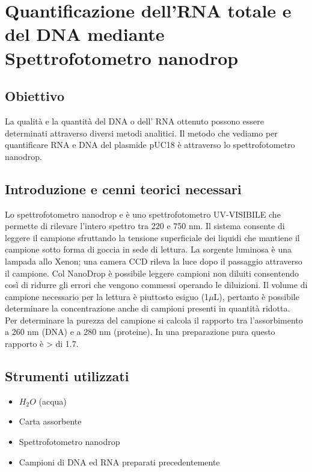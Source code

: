 \documentclass{extarticle}
\begin{document}
\newpage
\section{Quantificazione dell'RNA totale e del DNA mediante Spettrofotometro nanodrop}
\subsection*{Obiettivo} La qualità e la quantità del DNA o dell' RNA ottenuto possono essere determinati attraverso diversi metodi analitici. Il metodo che vediamo per quantificare RNA e DNA del plasmide pUC18 è attraverso lo spettrofotometro nanodrop.
\subsection*{Introduzione e cenni teorici necessari} Lo spettrofotometro nanodrop e è uno spettrofotometro UV-VISIBILE che permette di rilevare l'intero spettro tra 220 e 750 nm. Il sistema consente di leggere il campione sfruttando la tensione superficiale dei liquidi che mantiene il
campione sotto forma di goccia in sede di lettura. La sorgente luminosa è una lampada allo Xenon; una camera CCD rileva la luce dopo il passaggio attraverso il
campione. Col NanoDrop è possibile leggere campioni non diluiti consentendo così di ridurre gli errori che vengono commessi operando le diluizioni.
Il volume di campione necessario per la lettura è piuttosto esiguo (1$\mu$L), pertanto è possibile determinare la concentrazione anche di campioni presenti in quantità ridotta.\\
Per determinare la purezza del campione si calcola il rapporto tra l'assorbimento a 260 nm (DNA) e a 280 nm (proteine). In una preparazione pura questo rapporto è > di 1.7.
\subsection*{Strumenti utilizzati}
\begin{itemize}
    \item $H_{2}O$ (acqua)
    \item Carta assorbente
    \item Spettrofotometro nanodrop
    \item Campioni di DNA ed RNA preparati precedentemente
\end{itemize}
\end{document}
